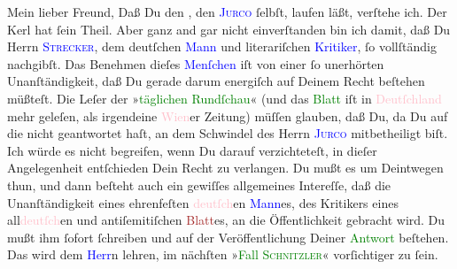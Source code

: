 \pstart\center{}Mein lieber Freund,\pend
\pstart
           Daß Du den \label{K_L03206-1v}\label{K_L03206-1h}, den \textsc{\textcolor{blue}{Jurco}{}\ledrightnote{\textcolor{blue}{Ernest von Gréger-Jurco}}} ſelbſt, laufen läßt, verſtehe ich. Der Kerl hat ſein Theil. Aber ganz and gar
               nicht einverſtanden bin ich damit, daß Du Herrn \textsc{\textcolor{blue}{Strecker}{}\ledrightnote{\textcolor{blue}{Karl Strecker}}}, dem deutſchen \textcolor{blue}{Mann}{}\ledrightnote{{$\rightarrow$}\textcolor{blue}{Karl Strecker}} und
               literariſchen \textcolor{blue}{Kritiker}{}\ledrightnote{{$\rightarrow$}\textcolor{blue}{Karl Strecker}}, ſo
               vollſtändig nachgibſt. Das Benehmen dieſes \textcolor{blue}{Menſchen}{}\ledrightnote{{$\rightarrow$}\textcolor{blue}{Karl Strecker}} iſt von einer ſo unerhörten Unanſtändigkeit, daß Du
               gerade darum energiſch auf Deinem Recht beſtehen müßteſt. Die Leſer der »\textcolor{green}{täglichen Rundſchau}{}\ledrightnote{\textcolor{green}{Tägliche Rundschau}}« (und das \textcolor{green}{Blatt}{}\ledrightnote{{$\rightarrow$}\textcolor{green}{Tägliche Rundschau}} iſt in \textcolor{pink}{Deutſchland}{}\ledrightnote{\textcolor{pink}{Deutschland}} mehr geleſen, als irgendeine \textcolor{pink}{Wien}{}\ledrightnote{\textcolor{pink}{Wien}}er Zeitung) müſſen glauben, daß Du, da Du auf die \label{K_L03206-2v}\label{K_L03206-2h} nicht geantwortet haſt, an dem Schwindel des Herrn \textsc{\textcolor{blue}{Jurco}{}\ledrightnote{\textcolor{blue}{Ernest von Gréger-Jurco}}} mitbetheiligt biſt. Ich würde es nicht begreifen, wenn {\pb}Du  darauf
               verzichteteſt, in dieſer Angelegenheit entſchieden Dein Recht zu verlangen. Du mußt
               es um Deintwegen thun, und dann beſteht auch ein gewiſſes allgemeines Intereſſe, daß
               die Unanſtändigkeit eines ehrenfeſten \textcolor{pink}{deutſch}{}\ledrightnote{{$\rightarrow$}\textcolor{pink}{Deutschland}}en \textcolor{blue}{Mann}{}\ledrightnote{{$\rightarrow$}\textcolor{blue}{Karl Strecker}}es, des Kritikers eines all\textcolor{pink}{deutſch}{}\ledrightnote{{$\rightarrow$}\textcolor{pink}{Deutschland}}en und antiſemitiſchen \textcolor{brown}{Blatt}{}\ledrightnote{{$\rightarrow$}\textcolor{brown}{Tägliche Rundschau}}es, an die Öffentlichkeit gebracht wird. Du \strikeout{\textcolor{gray}{m}} mußt ihm ſofort ſchreiben und auf der Veröffentlichung Deiner \textcolor{green}{Antwort}{}\ledrightnote{{$\rightarrow$}\textcolor{green}{Das angebliche Telegramm Arthur Schnitzlers}} beſtehen. Das wird dem \textcolor{blue}{Herr}{}\ledrightnote{{$\rightarrow$}\textcolor{blue}{Karl Strecker}}n lehren, im nächſten »\textcolor{green}{Fall \textsc{Schnitzler}}{}\ledrightnote{{$\rightarrow$}\textcolor{green}{Ein litterarisch-dramatisches Hochstapler-Stücklein}}« vorſichtiger zu ſein.\pend
           
